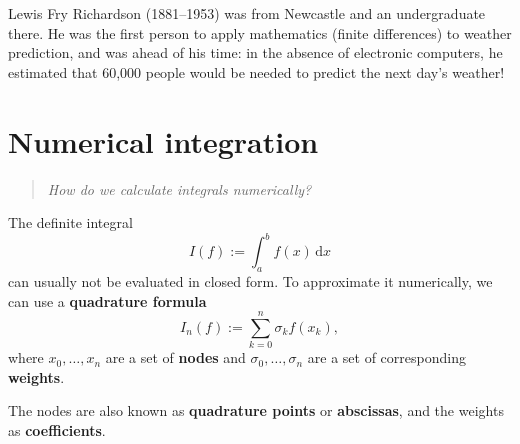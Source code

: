 \documentclass[
  letterpaper,
  DIV=11,
  numbers=noendperiod]{scrreprt}
\begin{document}
\begin{tcolorbox}[enhanced jigsaw, toptitle=1mm, breakable, colbacktitle=quarto-callout-note-color!10!white, colback=white, opacitybacktitle=0.6, rightrule=.15mm, bottomrule=.15mm, left=2mm, arc=.35mm, bottomtitle=1mm, title=\textcolor{quarto-callout-note-color}{\faInfo}\hspace{0.5em}{Note}, titlerule=0mm, toprule=.15mm, leftrule=.75mm, opacityback=0, colframe=quarto-callout-note-color-frame, coltitle=black]

Lewis Fry Richardson (1881--1953) was from Newcastle and an
undergraduate there. He was the first person to apply mathematics
(finite differences) to weather prediction, and was ahead of his time:
in the absence of electronic computers, he estimated that 60,000 people
would be needed to predict the next day's weather!

\end{tcolorbox}

\section{Numerical integration}\label{s-int}

\begin{quote}
\emph{How do we calculate integrals numerically?}
\end{quote}

The definite integral \[
I(f) := \int_a^b f(x)\,\mathrm{d}x
\] can usually not be evaluated in closed form. To approximate it
numerically, we can use a \textbf{quadrature formula} \[
I_n(f) := \sum_{k=0}^n \sigma_k f(x_k),
\] where \(x_0,\ldots,x_n\) are a set of \textbf{nodes} and
\(\sigma_0,\ldots,\sigma_n\) are a set of corresponding
\textbf{weights}.

\begin{tcolorbox}[enhanced jigsaw, toptitle=1mm, breakable, colbacktitle=quarto-callout-note-color!10!white, colback=white, opacitybacktitle=0.6, rightrule=.15mm, bottomrule=.15mm, left=2mm, arc=.35mm, bottomtitle=1mm, title=\textcolor{quarto-callout-note-color}{\faInfo}\hspace{0.5em}{Note}, titlerule=0mm, toprule=.15mm, leftrule=.75mm, opacityback=0, colframe=quarto-callout-note-color-frame, coltitle=black]

The nodes are also known as \textbf{quadrature points} or
\textbf{abscissas}, and the weights as \textbf{coefficients}.

\end{tcolorbox}
\end{document}
